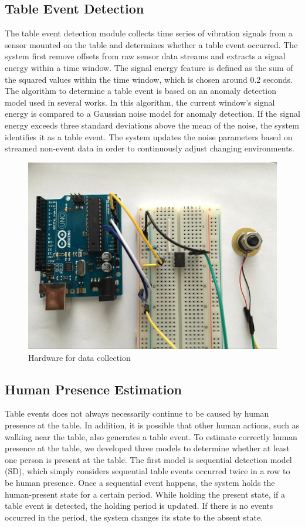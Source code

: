 \documentclass{sig-alternate-ipsn13}
\begin{document}
\subsection{Table Event Detection}
The table event detection module collects time series of vibration signals from a sensor mounted on the table and determines whether a table event occurred. The system first remove offsets from raw sensor data streams and extracts a signal energy within a time window. The signal energy feature is defined as the sum of the squared values within the time window, which is chosen around 0.2 seconds. The algorithm to determine a table event is based on an anomaly detection model used in several works\cite{cite1}. In this algorithm, the current window's signal energy is compared to a Gaussian noise model for anomaly detection. If the signal energy exceeds three standard deviations above the mean of the noise, the system identifies it as a table event. The system updates the noise parameters based on streamed non-event data in order to continuously adjust changing environments.


\begin{figure}
  \centering
  \includegraphics[width=1\linewidth]{figure/dataCollection.jpg}
  \caption{Hardware for data collection}
  \label{fig:DataCollection}
\end{figure}

\subsection{Human Presence Estimation}
Table events does not always necessarily continue to be caused by human presence at the table. In addition, it is possible that other human actions, such as walking near the table, also generates a table event. To estimate correctly human presence at the table, we developed three models to determine whether at least one person is present at the table. 
The first model is sequential detection model (SD), which simply considers sequential table events occurred twice in a row to be human presence. Once a sequential event happens, the system holds the human-present state for a certain period. While holding the present state, if a table event is detected, the holding period is updated. If there is no events occurred in the period, the system changes its state to the absent state. 
\end{document}
